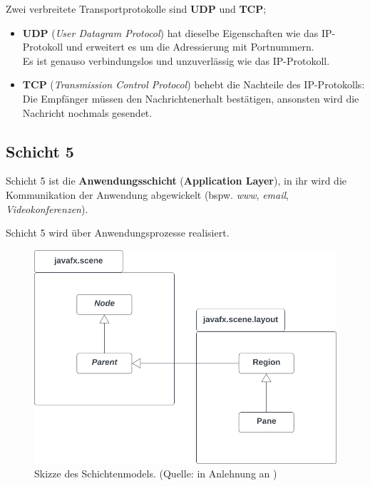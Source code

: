 \noindent
Zwei verbreitete Transportprotokolle sind \textbf{UDP} und \textbf{TCP};

\begin{itemize}
    \item \textbf{UDP} (\textit{User Datagram Protocol}) hat dieselbe Eigenschaften wie das IP-Protokoll und erweitert es um die Adressierung mit Portnummern.\\
    Es ist genauso verbindungslos und unzuverlässig wie das IP-Protokoll.
    \item \textbf{TCP} (\textit{Transmission Control Protocol}) behebt die Nachteile des IP-Protokolls: Die Empfänger müssen den Nachrichtenerhalt bestätigen, ansonsten wird die Nachricht nochmals gesendet.
\end{itemize}


\subsection*{Schicht 5}
Schicht 5 ist die \textbf{Anwendungsschicht} (\textbf{Application Layer}), in ihr wird die Kommunikation der Anwendung abgewickelt (bspw. \textit{www}, \textit{email}, \textit{Videokonferenzen}).


\begin{tcolorbox}
    Schicht 5 wird über Anwendungsprozesse realisiert.
\end{tcolorbox}


\begin{figure}
    \centering
    \includegraphics[scale=0.5]{chapters/fopt3/img/javafx/pane}
    \caption{Skizze des Schichtenmodels. (Quelle: in Anlehnung an \cite[257, Bild 5.2]{Oec22})}
    \label{fig:layers}
\end{figure}
